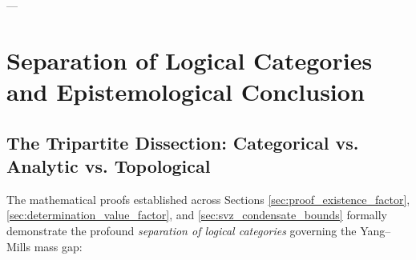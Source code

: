 ---

\section{Separation of Logical Categories and Epistemological Conclusion}
\label{sec:separation_categories}

\subsection{The Tripartite Dissection: Categorical vs. Analytic vs. Topological}
\label{subsec:tripartite_dissection}

The mathematical proofs established across Sections \ref{sec:proof_existence_factor}, \ref{sec:determination_value_factor}, and \ref{sec:svz_condensate_bounds} formally demonstrate the profound \emph{separation of logical categories} governing the Yang--Mills mass gap:

